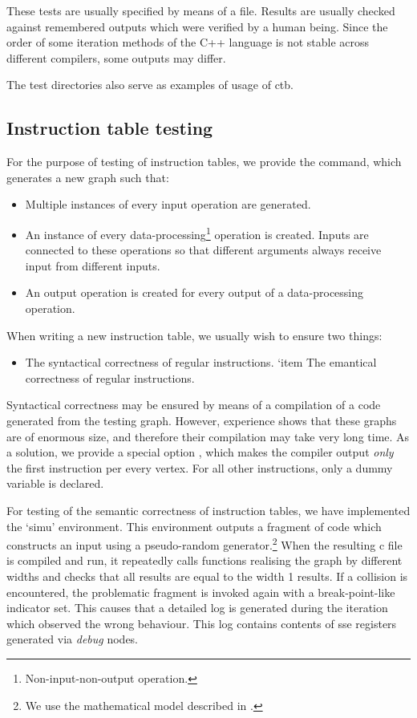 These tests are usually specified by means of a  file. Results are usually checked against remembered outputs which were verified by a human being. Since the order of some iteration methods of the C++ language is not stable across different compilers, some outputs may differ.

The test directories also serve as examples of usage of ctb.

\subsection*{Instruction table testing}

For the purpose of testing of instruction tables, we provide the  command, which generates a new graph such that:
\begin{itemize}
  \item Multiple instances of every input operation are generated.
  \item An instance of every data-processing\footnote{Non-input-non-output operation.} operation is created. Inputs are connected to these operations so that different arguments always receive input from different inputs.
  \item An output operation is created for every output of a data-processing operation.
\end{itemize}

When writing a new instruction table, we usually wish to ensure two things:
\begin{itemize}
  \item The syntactical correctness of regular instructions.
  `item The emantical correctness of regular instructions.
\end{itemize}

Syntactical correctness may be ensured by means of a compilation of a code generated from the testing graph. However, experience shows that these graphs are of enormous size, and therefore their compilation may take very long time. As a solution, we provide a special option , which makes the compiler output \emph{only} the first instruction per every vertex. For all other instructions, only a dummy variable is declared.

For testing of the semantic correctness of instruction tables, we have implemented the `simu' environment. This environment outputs a fragment of code which constructs an input using a pseudo-random generator.\footnote{We use the mathematical model described in \cite{generator}.} When the resulting c file is compiled and run, it repeatedly calls functions realising the graph by different widths and checks that all results are equal to the width 1 results. If a collision is encountered, the problematic fragment is invoked again with a break-point-like indicator set. This causes that a detailed log is generated during the iteration which observed the wrong behaviour. This log contains contents of sse registers generated via \emph{debug} nodes.

